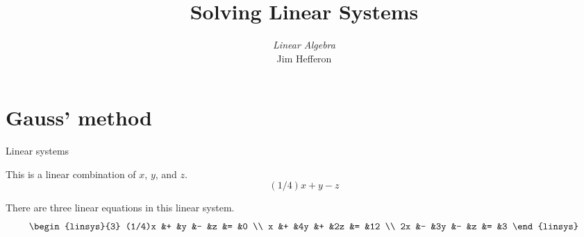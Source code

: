 \documentclass[10pt,t,serif,professionalfont]{beamer}
\title[Solving Linear Systems] %
{Solving Linear Systems}
\author{\textit{Linear Algebra} \\ {\small Jim Hef{}feron}}
\institute{
  \texttt{http://joshua.smcvt.edu/linearalgebra}
}
\date{}
\begin{document}
\begin{frame}
  \titlepage
\end{frame}




\section{Gauss' method}
\begin{frame}{Linear systems} 

\ex This is a linear combination of $x$, $y$, and $z$.
\begin{equation*}
   (1/4)x+y-z
\end{equation*}
\end{frame}


\begin{frame}
\ex 
There are three linear equations in this linear system.
\begin{equation*}
  \begin{linsys}{3}
   (1/4)x  &+  &y  &-  &z  &=  &0  \\
        x  &+  &4y &+  &2z &=  &12  \\
       2x  &-  &3y &-  &z  &=  &3  
  \end{linsys}  
\end{equation*}
\end{frame}
\end{document}
